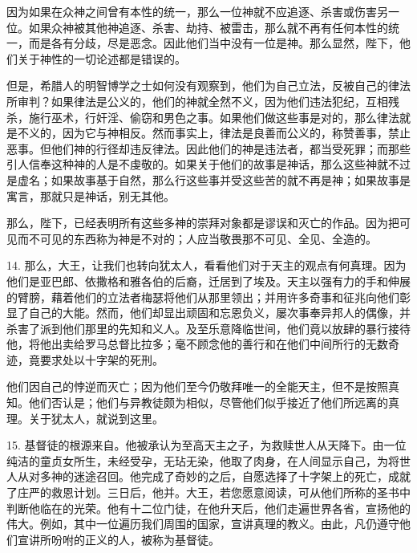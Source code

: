 因为如果在众神之间曾有本性的统一，那么一位神就不应追逐、杀害或伤害另一位。如果众神被其他神追逐、杀害、劫持、被雷击，那么就不再有任何本性的统一，而是各有分歧，尽是恶念。因此他们当中没有一位是神。那么显然，陛下，他们关于神性的一切论述都是错误的。\par

但是，希腊人的明智博学之士如何没有观察到，他们为自己立法，反被自己的律法所审判？如果律法是公义的，他们的神就全然不义，因为他们违法犯纪，互相残杀，施行巫术，行奸淫、偷窃和男色之事。如果他们做这些事是对的，那么律法就是不义的，因为它与神相反。然而事实上，律法是良善而公义的，称赞善事，禁止恶事。但他们神的行径却违反律法。因此他们的神是违法者，都当受死罪；而那些引人信奉这种神的人是不虔敬的。如果关于他们的故事是神话，那么这些神就不过是虚名；如果故事基于自然，那么行这些事并受这些苦的就不再是神；如果故事是寓言，那就只是神话，别无其他。\par

那么，陛下，已经表明所有这些多神的崇拜对象都是谬误和灭亡的作品。因为把可见而不可见的东西称为神是不对的；人应当敬畏那不可见、全见、全造的。\par

14. 那么，大王，让我们也转向犹太人，看看他们对于天主的观点有何真理。因为他们是亚巴郎、依撒格和雅各伯的后裔，迁居到了埃及。天主以强有力的手和伸展的臂膀，藉着他们的立法者梅瑟将他们从那里领出；并用许多奇事和征兆向他们彰显了自己的大能。然而，他们却显出顽固和忘恩负义，屡次事奉异邦人的偶像，并杀害了派到他们那里的先知和义人。及至乐意降临世间，他们竟以放肆的暴行接待他，将他出卖给罗马总督比拉多；毫不顾念他的善行和在他们中间所行的无数奇迹，竟要求处以十字架的死刑。\par

他们因自己的悖逆而灭亡；因为他们至今仍敬拜唯一的全能天主，但不是按照真知。他们否认是；他们与异教徒颇为相似，尽管他们似乎接近了他们所远离的真理。关于犹太人，就说到这里。\par

15. 基督徒的根源来自。他被承认为至高天主之子，为救赎世人从天降下。由一位纯洁的童贞女所生，未经受孕，无玷无染，他取了肉身，在人间显示自己，为将世人从对多神的迷途召回。他完成了奇妙的之后，自愿选择了十字架上的死亡，成就了庄严的救恩计划。三日后，他并。大王，若您愿意阅读，可从他们所称的圣书中判断他临在的光荣。他有十二位门徒，在他升天后，他们走遍世界各省，宣扬他的伟大。例如，其中一位遍历我们周围的国家，宣讲真理的教义。由此，凡仍遵守他们宣讲所吩咐的正义的人，被称为基督徒。\par

